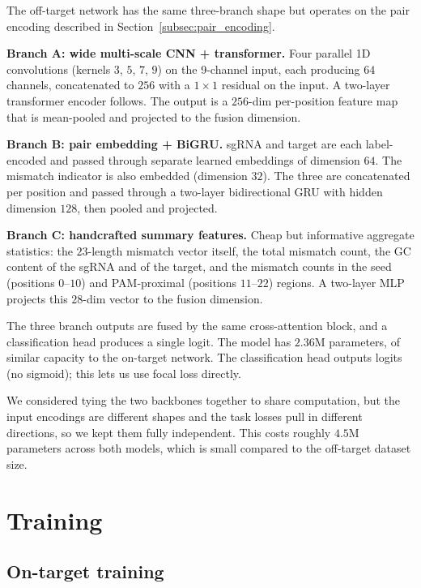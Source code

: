 \documentclass[11pt,a4paper]{article}
\begin{document}
The off-target network has the same three-branch shape but operates on the pair encoding described in Section~\ref{subsec:pair_encoding}.

\textbf{Branch A: wide multi-scale CNN + transformer.} Four parallel 1D convolutions (kernels $3$, $5$, $7$, $9$) on the 9-channel input, each producing $64$ channels, concatenated to $256$ with a $1\!\times\!1$ residual on the input. A two-layer transformer encoder follows. The output is a $256$-dim per-position feature map that is mean-pooled and projected to the fusion dimension.

\textbf{Branch B: pair embedding + BiGRU.} sgRNA and target are each label-encoded and passed through separate learned embeddings of dimension $64$. The mismatch indicator is also embedded (dimension $32$). The three are concatenated per position and passed through a two-layer bidirectional GRU with hidden dimension $128$, then pooled and projected.

\textbf{Branch C: handcrafted summary features.} Cheap but informative aggregate statistics: the $23$-length mismatch vector itself, the total mismatch count, the GC content of the sgRNA and of the target, and the mismatch counts in the seed (positions $0$--$10$) and PAM-proximal (positions $11$--$22$) regions. A two-layer MLP projects this $28$-dim vector to the fusion dimension.

The three branch outputs are fused by the same cross-attention block, and a classification head produces a single logit. The model has $2.36$M parameters, of similar capacity to the on-target network. The classification head outputs logits (no sigmoid); this lets us use focal loss directly.

We considered tying the two backbones together to share computation, but the input encodings are different shapes and the task losses pull in different directions, so we kept them fully independent. This costs roughly $4.5$M parameters across both models, which is small compared to the off-target dataset size.

\section{Training}
\label{sec:training}

\subsection{On-target training}
\end{document}
